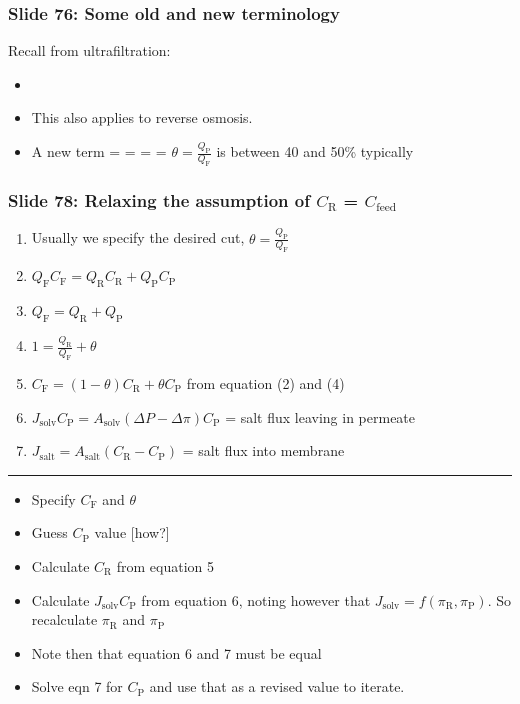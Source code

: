 
\begin{frame}\frametitle{Slide 76: Some old and new terminology}
	
	Recall from ultrafiltration:
	\begin{itemize}
		\item	{}
		
		\item	This {\color{purple}{rejection coefficient}} also applies to reverse osmosis.
		
		\item	A new term = {\color{purple}{cut}} = {\color{purple}{conversion}} = {\color{purple}{recovery}} = $\theta = \displaystyle \frac{Q_\text{P}}{Q_\text{F}}$ is between 40 and 50\% typically
	\end{itemize}	
\end{frame}

\begin{frame}\frametitle{Slide 78: Relaxing the assumption of $C_\text{R}$ = $C_\text{feed}$}
	\begin{enumerate}
		\item	Usually we specify the desired cut, $\theta = \displaystyle \frac{Q_\text{P}}{Q_\text{F}}$
		\item	$Q_\text{F} C_\text{F} = Q_\text{R} C_\text{R} + Q_\text{P} C_\text{P}$
		\item	$Q_\text{F} = Q_\text{R} + Q_\text{P}$
		\item	$1 = \displaystyle \frac{Q_\text{R}}{Q_\text{F}} + \theta$
		\item	$C_\text{F} = (1 - \theta)C_\text{R} + \theta C_\text{P}$ from equation (2) and (4)
		\item	$J_\text{solv}C_\text{P} = A_\text{solv}(\Delta P - \Delta \pi)C_\text{P}$ = salt flux leaving in permeate
		\item	$J_\text{salt} = A_\text{salt}(C_\text{R} - C_\text{P})$ = salt flux into membrane
	\end{enumerate}
	\hrule
	\begin{itemize}
		\item	Specify $C_\text{F}$ and $\theta$
		\item	Guess $C_\text{P}$ value [how?]
		\item	Calculate $C_\text{R}$ from equation 5
		\item	Calculate $J_\text{solv} C_\text{P}$ from equation 6, noting however that $J_\text{solv} = f(\pi_\text{R}, \pi_\text{P})$. So recalculate $\pi_\text{R}$ and $\pi_\text{P}$
		\item	Note then that equation 6 and 7 must be equal
		\item	Solve eqn 7 for $C_\text{P}$ and use that as a revised value to iterate.
	\end{itemize}	
\end{frame}

